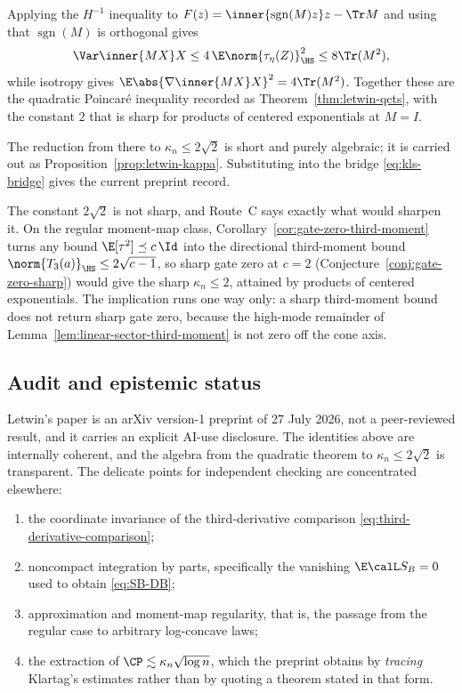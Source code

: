 \documentclass[../../main.tex]{subfiles}
\begin{document}
Applying the $H^{-1}$ inequality to $F(z)=\inner{\operatorname{sgn}(M)z}z-\Tr M$ and using that
$\operatorname{sgn}(M)$ is orthogonal gives
\[
  \Var\inner{MX}X\le4\,\E\norm{\tau_\eta(Z)}_{\HS}^2\le8\Tr(M^2),
\]
while isotropy gives $\E\abs{\nabla\inner{MX}X}^2=4\Tr(M^2)$. Together these are the quadratic
Poincar\'e inequality recorded as Theorem~\ref{thm:letwin-qcts}, with the constant $2$ that is
sharp for products of centered exponentials at $M=I$.

The reduction from there to $\kappa_n\le2\sqrt2$ is short and purely algebraic; it is carried out
as Proposition~\ref{prop:letwin-kappa}. Substituting into the bridge \eqref{eq:kls-bridge} gives
the current preprint record.

The constant $2\sqrt2$ is not sharp, and Route~C says exactly what would sharpen it. On the
regular moment-map class, Corollary~\ref{cor:gate-zero-third-moment} turns any bound
$\E[\tau^2]\preceq c\,\Id$ into the directional third-moment bound
$\norm{T_3(a)}_{\HS}\le2\sqrt{c-1}$, so sharp gate zero at $c=2$
(Conjecture~\ref{conj:gate-zero-sharp}) would give the sharp $\kappa_n\le2$, attained by
products of centered exponentials. The implication runs one way only: a sharp third-moment
bound does not return sharp gate zero, because the high-mode remainder of
Lemma~\ref{lem:linear-sector-third-moment} is not zero off the cone axis.

\subsection{Audit and epistemic status}
\label{subsec:mm-audit}

Letwin's paper is an arXiv version-1 preprint of 27 July 2026, not a peer-reviewed result, and it
carries an explicit AI-use disclosure. The identities above are internally coherent, and the
algebra from the quadratic theorem to $\kappa_n\le2\sqrt2$ is transparent. The delicate points for
independent checking are concentrated elsewhere:

\begin{enumerate}[label=(\alph*),leftmargin=2.2em]
  \item the coordinate invariance of the third-derivative comparison
  \eqref{eq:third-derivative-comparison};
  \item noncompact integration by parts, specifically the vanishing $\E\calL S_B=0$ used to obtain
  \eqref{eq:SB-DB};
  \item approximation and moment-map regularity, that is, the passage from the regular case to
  arbitrary log-concave laws;
  \item the extraction of $\CP\lesssim\kappa_n\sqrt{\log n}$, which the preprint obtains by
  \emph{tracing} Klartag's estimates \cite{Klartag2023Logarithmic} rather than by quoting a
  theorem stated in that form.
\end{enumerate}
\end{document}
